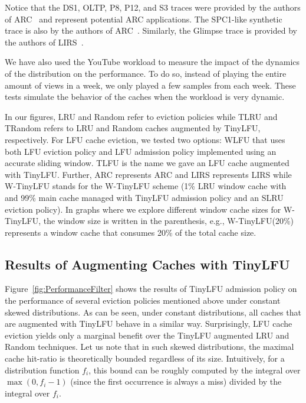 \documentclass[10pt,a4paper]{article}
\begin{document}
Notice that the DS1, OLTP, P8, P12, and S3 traces were provided by the authors of ARC~\cite{ARC} and represent potential ARC applications.
The SPC1-like synthetic trace is also by the authors of ARC~\cite{ARC}.
Similarly, the Glimpse trace is provided by the authors of LIRS~\cite{LIRS}.







We have also used the YouTube workload to measure the impact of the dynamics of the distribution on the performance.
To do so, instead of playing the entire amount of views in a week, we only played a few samples from each week.
These tests simulate the behavior of the caches when the workload is very dynamic.

In our figures, LRU and Random refer to eviction policies while TLRU and TRandom refers to LRU and Random caches augmented by TinyLFU, respectively.
For LFU cache eviction, we tested two options: WLFU that uses both LFU eviction policy and LFU admission policy implemented using an accurate sliding window.
TLFU is the name we gave an LFU cache augmented with TinyLFU.
Further, ARC represents ARC and LIRS represents LIRS while W-TinyLFU stands for the W-TinyLFU scheme (1\% LRU window cache with and 99\% main cache managed with TinyLFU admission policy and an SLRU eviction policy).
In graphs where we explore different window cache sizes for W-TinyLFU, the window size is written in the parenthesis, e.g., W-TinyLFU(20\%) represents a window cache that consumes 20\% of the total cache size.





\subsection{Results of Augmenting Caches with TinyLFU}
\label{sec:simulator}

Figure~\ref{fig:PerformanceFilter} shows the results of TinyLFU admission policy on the performance of several eviction policies mentioned above under constant skewed distributions.
As can be seen, under constant distributions, all caches that are augmented with TinyLFU behave in a similar way.
Surprisingly, LFU cache eviction yields only a marginal benefit over the TinyLFU augmented LRU and Random techniques.
Let us note that in such skewed distributions, the maximal cache hit-ratio is theoretically bounded regardless of its size.
Intuitively, for a distribution function $f_i$, this bound can be roughly computed by the integral over $\max(0,f_i-1)$ (since the first occurrence is always a miss)
divided by the integral over $f_i$.
\end{document}
